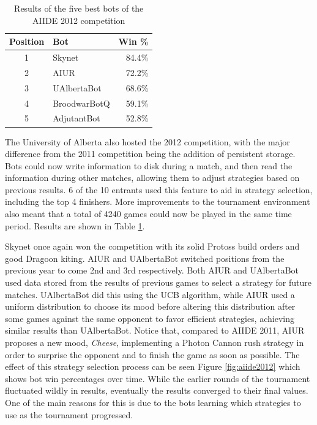 \documentclass[journal]{IEEEtran}
\begin{document}
\begin{table}[!t]
\caption{Results of the five best bots of the AIIDE 2012 competition}
\label{tab:aiide2012}
\centering
\begin{tabular}{|c|l|r|}
\hline
{\bfseries Position} & {\bfseries Bot} & {\bfseries Win \%} \\
\hline
1 & Skynet & 84.4\% \\
2 & AIUR & 72.2\% \\
3 & UAlbertaBot & 68.6\% \\
4 & BroodwarBotQ & 59.1\% \\
5 & AdjutantBot & 52.8\% \\
\hline
\end{tabular}
\end{table}

The University of Alberta also hosted the 2012 competition, with the major difference from the 2011
competition being the addition of persistent storage. Bots could now write information to disk during a
match, and then read the information during other matches, allowing them to adjust strategies based
on previous results. 6 of the 10 entrants used this feature to aid in strategy selection, including the
top 4 finishers. More improvements to the tournament environment also meant that a total of 4240 games
could now be played in the same time period. Results are shown in Table \ref{tab:aiide2012}.

Skynet once  again won  the competition with  its solid  Protoss build
orders  and  good  Dragoon  kiting.   AIUR  and  UAlbertaBot  switched
positions from  the previous  year to come  2nd and  3rd respectively.
Both  AIUR  and UAlbertaBot  used  data  stored  from the  results  of
previous games  to select a strategy for  future matches.  UAlbertaBot
did  this  using  the  UCB  \cite{auer2002finite} algorithm,  while  AIUR  used  a  uniform
distribution  to choose  its  mood before  altering this  distribution
after  some  games  against  the  same  opponent  to  favor  efficient
strategies, achieving  similar results than  UAlbertaBot. Notice that,
compared  to AIIDE 2011,  AIUR proposes  a new  mood, \textit{Cheese},
implementing a  Photon Cannon rush  strategy in order to  surprise the
opponent and  to finish the game  as soon as possible.   The effect of
this strategy selection process can be seen Figure \ref{fig:aiide2012}
which shows bot  win percentages over time.  While  the earlier rounds
of the tournament fluctuated wildly in results, eventually the results
converged to their  final values. One of the main  reasons for this is
due to  the bots  learning which strategies  to use as  the tournament
progressed.
\end{document}
